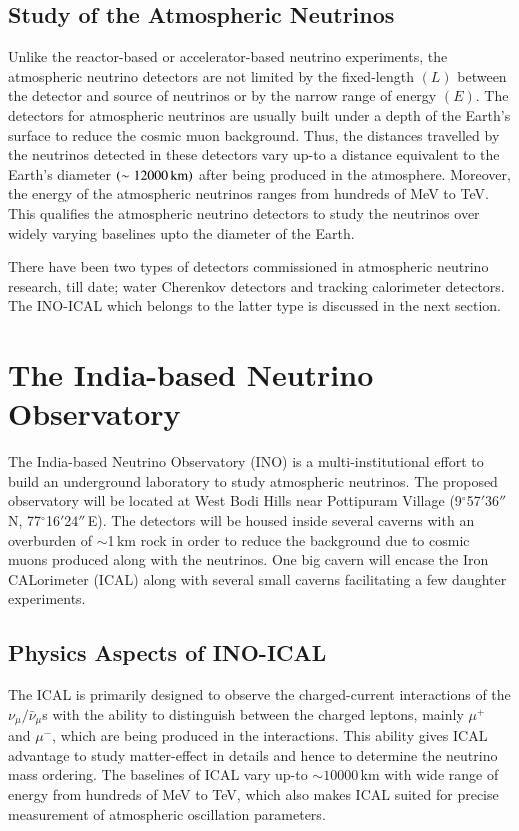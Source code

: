 \subsection{Study of the Atmospheric Neutrinos}
Unlike the reactor-based or accelerator-based neutrino experiments,
the atmospheric neutrino detectors are not limited by the fixed-length
$\left(L\right)$ between the detector and source of neutrinos or by
the narrow range of energy $\left(E\right)$. The detectors for
atmospheric neutrinos are usually built under a depth of the Earth's
surface to reduce the cosmic muon background. Thus, the distances
travelled by the neutrinos detected in these detectors vary up-to a
distance equivalent to the Earth's diameter
$\left(\sim 12000\text{\,km}\right)$ after being produced in the
atmosphere. Moreover, the energy of the atmospheric neutrinos ranges
from hundreds of MeV to TeV. This qualifies the atmospheric neutrino
detectors to study the neutrinos over widely varying baselines
upto the diameter of the Earth.

There have been two types of detectors commissioned in atmospheric
neutrino research, till date; water Cherenkov detectors and tracking
calorimeter detectors. The INO-ICAL which belongs to the latter type
is discussed in the next section.

\section{The India-based Neutrino Observatory}
The India-based Neutrino Observatory (INO)\cite{inowhite,inoreport}
is a multi-institutional effort to build an underground laboratory to
study atmospheric neutrinos. The proposed observatory will be located
at West Bodi Hills near Pottipuram Village (9$^\circ$57$'$36$''$\,N,
77$^\circ$16$'$24$''$\,E). The detectors will be housed inside several
caverns with an overburden of $\sim$1\,km rock in order to reduce the
background due to cosmic muons produced along with the neutrinos. One
big cavern will encase the Iron CALorimeter (ICAL) along with several
small caverns facilitating a few daughter experiments.

\subsection{Physics Aspects of INO-ICAL}
The ICAL is primarily designed to observe the charged-current
interactions of the $\nu_{\mu}/\bar{\nu}_{\mu}$s with the ability to
distinguish between the charged leptons, mainly $\mu^{+}$ and $\mu^{-}$,
which are being produced in the interactions. This ability gives ICAL
advantage to study matter-effect in details and hence to determine the
neutrino mass ordering. The baselines of ICAL vary up-to
$\sim 10000$\,km with wide range of energy from hundreds of MeV to
TeV, which also makes ICAL suited for precise measurement of
atmospheric oscillation parameters. %

